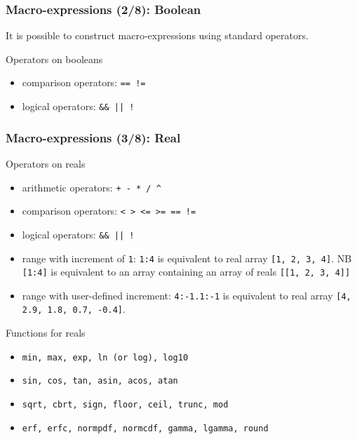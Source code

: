 \documentclass{beamer}
\begin{document}
\begin{frame}[fragile=singleslide]
  \frametitle{Macro-expressions (2/8): Boolean}
  It is possible to construct macro-expressions using standard operators.
  \begin{block}{Operators on booleans}
    \begin{itemize}
    \item comparison operators: \texttt{== !=}
    \item logical operators: \verb+&& || !+
    \end{itemize}
  \end{block}
\end{frame}

\begin{frame}[fragile=singleslide]
  \frametitle{Macro-expressions (3/8): Real}
  \begin{block}{Operators on reals}
    \begin{itemize}
    \item arithmetic operators: \texttt{+ - * / \^{}}
    \item comparison operators: \texttt{< > <= >= == !=}
    \item logical operators: \verb+&& || !+
    \item range with increment of \texttt{1}: \texttt{1:4} is equivalent to real array \texttt{[1, 2, 3, 4]}. NB \texttt{[1:4]} is equivalent to an array containing an array of reals \texttt{[[1, 2, 3, 4]]}
    \item range with user-defined increment: \texttt{4:-1.1:-1} is equivalent to real array \texttt{[4, 2.9, 1.8, 0.7, -0.4]}.
    \end{itemize}
  \end{block}

  \begin{block}{Functions for reals}
    \begin{itemize}
    \item \texttt{min, max, exp, ln (or log), log10}
    \item \texttt{sin, cos, tan, asin, acos, atan}
    \item \texttt{sqrt, cbrt, sign, floor, ceil, trunc, mod}
    \item \texttt{erf, erfc, normpdf, normcdf, gamma, lgamma, round}
    \end{itemize}
  \end{block}
\end{frame}
\end{document}
